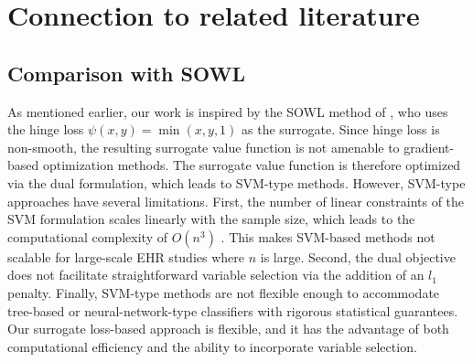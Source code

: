 \documentclass[preprint] {imsart}
\begin{document}
\section{Connection to related literature}
\label{sec: related literature}
  
  \subsection*{Comparison with SOWL \citep{zhao2015}}
  As mentioned earlier, our work is inspired by the SOWL method of \cite{zhao2015}, who uses the hinge loss $\psi(x,y)=\min(x,y,1)$ as the surrogate. Since hinge loss is non-smooth, the resulting surrogate value function is not amenable to gradient-based optimization methods.  The surrogate value function is therefore optimized via the dual formulation, which leads to SVM-type methods.  However, SVM-type approaches have several limitations. First, the number of linear constraints of the SVM formulation  scales linearly with the sample size, which leads to  the computational complexity of $O(n^3)$ \citep{NIPS2000_19de10ad}. This makes SVM-based methods not scalable for large-scale EHR studies where $n$ is large.  Second, the dual objective does not facilitate straightforward variable selection via the addition of an  $l_1$ penalty. Finally, SVM-type methods are not flexible enough to accommodate tree-based or neural-network-type classifiers with rigorous statistical guarantees. Our surrogate loss-based approach is flexible, and it has the advantage of both computational efficiency and the ability to incorporate variable selection. %
  
\end{document}
